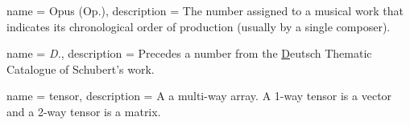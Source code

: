 
{
    name        = {Opus (Op.)},
description = {The number assigned to a musical work that indicates its chronological order of production (usually by a single composer).}
}

{
    name        = {\textit{D.}},
description = {Precedes a number from the \underline{D}eutsch Thematic Catalogue of Schubert's work.}
}

{
    name        = {tensor},
description = {A a multi-way array. A 1-way tensor is a vector and a 2-way tensor is a matrix.}
}
